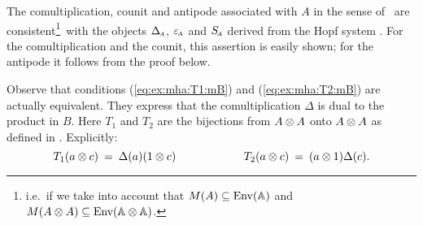 {\small
\begin{remarks*} \label{rem:mha:Hopf_system}
\item
The comultiplication, counit and antipode associated with $A$ in the sense of
\cite{Fons:MHA}\ are consistent\footnote{i.e.\ if we take into account that
$M(A) \subseteq \mbox{\rm Env}(\mathbb{A})$ and $M(A \otimes A) \subseteq \mbox{\rm Env}(\mathbb{A} \otimes \mathbb{A})$.}\
with the objects $\Delta_{\scriptscriptstyle \! A}$, $\varepsilon_{\scriptscriptstyle \! A}$ and $S_{\scriptscriptstyle \! A}$ derived from the Hopf system \pairAB\@.
For the comultiplication and the counit, this assertion is easily shown;
for the antipode it follows from the proof below.
\item
Observe that conditions (\ref{eq:ex:mha:T1:mB}) and (\ref{eq:ex:mha:T2:mB})
are actually equivalent.
They express that the comultiplication $\Delta$ is dual to the product in $B$.
Here $T_1$ and $T_2$ are the bijections from $A\otimes A$ onto $A\otimes A$ as
defined in \cite{Fons:MHA}\@. Explicitly:
$$  T_1(a \otimes c) \:=\: \Delta(a)(1 \otimes c)   \hspace{6em}
    T_2(a \otimes c) \:=\: (a \otimes 1)\Delta(c).  $$
\end{remarks*} } %


